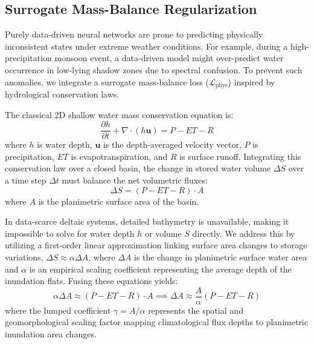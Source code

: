 \documentclass[preprint,12pt]{elsarticle}
\begin{document}
\subsection{Surrogate Mass-Balance Regularization}
Purely data-driven neural networks are prone to predicting physically inconsistent states under extreme weather conditions. For example, during a high-precipitation monsoon event, a data-driven model might over-predict water occurrence in low-lying shadow zones due to spectral confusion. To prevent such anomalies, we integrate a surrogate mass-balance loss ($\mathcal{L}_{\text{phys}}$) inspired by hydrological conservation laws.

The classical 2D shallow water mass conservation equation is:
\begin{equation}
\frac{\partial h}{\partial t} + \nabla \cdot (h \mathbf{u}) = P - ET - R
\end{equation}
where $h$ is water depth, $\mathbf{u}$ is the depth-averaged velocity vector, $P$ is precipitation, $ET$ is evapotranspiration, and $R$ is surface runoff. Integrating this conservation law over a closed basin, the change in stored water volume $\Delta S$ over a time step $\Delta t$ must balance the net volumetric fluxes:
\begin{equation}
\Delta S = (P - ET - R) \cdot A
\end{equation}
where $A$ is the planimetric surface area of the basin. 

In data-scarce deltaic systems, detailed bathymetry is unavailable, making it impossible to solve for water depth $h$ or volume $S$ directly. We address this by utilizing a first-order linear approximation linking surface area changes to storage variations, $\Delta S \approx \alpha \Delta A$, where $\Delta A$ is the change in planimetric surface water area and $\alpha$ is an empirical scaling coefficient representing the average depth of the inundation flats. Fusing these equations yields:
\begin{equation}
\alpha \Delta A \approx (P - ET - R) \cdot A \implies \Delta A \approx \frac{A}{\alpha} (P - ET - R)
\end{equation}
where the lumped coefficient $\gamma = A / \alpha$ represents the spatial and geomorphological scaling factor mapping climatological flux depths to planimetric inundation area changes.
\end{document}
